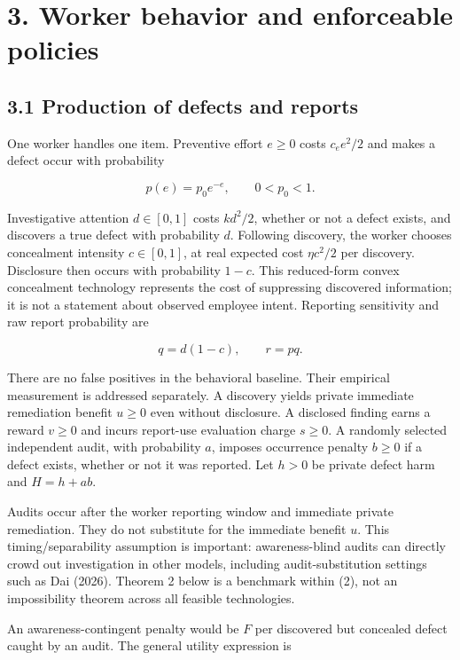 \documentclass[
  11pt,
]{article}
\begin{document}
\section{3. Worker behavior and enforceable
policies}\label{worker-behavior-and-enforceable-policies}

\subsection{3.1 Production of defects and
reports}\label{production-of-defects-and-reports}

One worker handles one item. Preventive effort \(e\geq0\) costs
\(c_e e^2/2\) and makes a defect occur with probability

\[p(e)=p_0e^{-e},\qquad 0<p_0<1.\]

Investigative attention \(d\in[0,1]\) costs \(kd^2/2\), whether or not a
defect exists, and discovers a true defect with probability \(d\).
Following discovery, the worker chooses concealment intensity
\(c\in[0,1]\), at real expected cost \(\eta c^2/2\) per discovery.
Disclosure then occurs with probability \(1-c\). This reduced-form
convex concealment technology represents the cost of suppressing
discovered information; it is not a statement about observed employee
intent. Reporting sensitivity and raw report probability are

\[q=d(1-c),\qquad r=pq. \tag{1}\]

There are no false positives in the behavioral baseline. Their empirical
measurement is addressed separately. A discovery yields private
immediate remediation benefit \(u\geq0\) even without disclosure. A
disclosed finding earns a reward \(v\geq0\) and incurs report-use
evaluation charge \(s\geq0\). A randomly selected independent audit,
with probability \(a\), imposes occurrence penalty \(b\geq0\) if a
defect exists, whether or not it was reported. Let \(h>0\) be private
defect harm and \(H=h+ab\).

Audits occur after the worker reporting window and immediate private
remediation. They do not substitute for the immediate benefit \(u\).
This timing/separability assumption is important: awareness-blind audits
can directly crowd out investigation in other models, including
audit-substitution settings such as Dai (2026). Theorem 2 below is a
benchmark within (2), not an impossibility theorem across all feasible
technologies.

An awareness-contingent penalty would be \(F\) per discovered but
concealed defect caught by an audit. The general utility expression is
\end{document}
